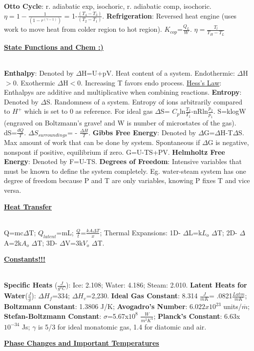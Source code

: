 \documentclass{article}
\begin{document}
\begin{multicols*}{3}{}
\textbf{Otto Cycle}: r. adiabatic exp, isochoric, r. adiabatic comp, isochoric. $\eta = 1 - \frac{1}{(1-r^{({\gamma}-1)})}$ = 1-$\frac{(T_{4}-T_{3})}{(T_{2}-T_{1})}$. \textbf{Refrigeration}: Reversed heat engine (uses work to move heat from colder region to hot region). $K_{cop}$=$\frac{Q_{L}}{W}$. $\eta =  \frac{T_{l}}{T_{H}-T_{L}}$ \\
\begin{small}
\textbf{\underline{State Functions and Chem :)}}
\end{small} \\
\textbf{Enthalpy}: Denoted by $\Delta$H=U+pV. Heat content of a system. Endothermic: $\Delta$H$>$0. Exothermic $\Delta$H$<$0. Increasing T favors endo process. \underline{Hess's Law}: Enthalpys are additive and multiplicative when combining reactions. \textbf{Entropy}: Denoted by $\Delta$S. Randomness of a system. Entropy of ions arbitrarily compared to $H^{+}$ which is set to 0 as reference. For ideal gas $\Delta$S= $C_{p}$ln$\frac{T_{2}}{T_{1}}$-nRln$\frac{p_{2}}{p_{1}}$. S=klogW (engraved on Boltzmann's grave! and W is number of microstates of the gas). dS=$\frac{dQ}{T}$. $\Delta S_{surroundings}$= - $\frac{\Delta H}{T}$. \textbf{Gibbs Free Energy}: Denoted by $\Delta$G=$\Delta$H-T$\Delta$S. Max amount of work that can be done by system. Spontaneous if $\Delta$G is negative, nonspont if positive, equilibrium if zero. G=U-TS+PV. \textbf{Helmholtz Free Energy}: Denoted by F=U-TS. \textbf{Degrees of Freedom}: Intensive variables that must be known to define the system completely. Eg. water-steam system has one degree of freedom because P and T are only variables, knowing P fixes T and vice versa. \\
\begin{small}
\textbf{\underline{Heat Transfer}}
\end{small}
\\
Q=mc$\Delta$T; $Q_{latent}$=mL; $\frac{Q}{t}$=$\frac{kA \Delta T}{x}$; Thermal Expansions: 1D- $\Delta$L=k$L_{o}$ $\Delta$T; 2D- $\Delta$A=2k$A_{o}$ $\Delta$T; 3D- $\Delta$V=3k$V_{o}$ $\Delta$T. \\
\begin{small}
\textbf{\underline{Constants!!!}}
\end{small}
\\
\textbf{Specific Heats} ($\frac{J}{g^{o}C}$): Ice: 2.108; Water: 4.186; Steam: 2.010. \textbf{Latent Heats for Water}($\frac{J}{g}$): $\Delta H_{f}$=334; $\Delta H_{v}$=2,230. \textbf{Ideal Gas Constant}: 8.314 $\frac{J}{\overline{m}K}$= .0821$\frac{L atm}{\overline{m}K}$; \textbf{Boltzmann Constant}: 1.3806 J/K; \textbf{Avogadro's Number}: $6.022x10^{23}$ units/$\overline{m}$; \textbf{Stefan-Boltzmann Constant}: $\sigma$=5.67x$10^{8}$ $\frac{W}{m^{2}K^{4}}$; \textbf{Planck's Constant}: 6.63x$10^{-34}$ Js; $\gamma$ is 5/3 for ideal monatomic gas, 1.4 for diatomic and air.
\\
\begin{Small}
\textbf{\underline{Phase Changes and Important Temperatures}}
\end{Small}
\\


\end{multicols*}
\end{document}
